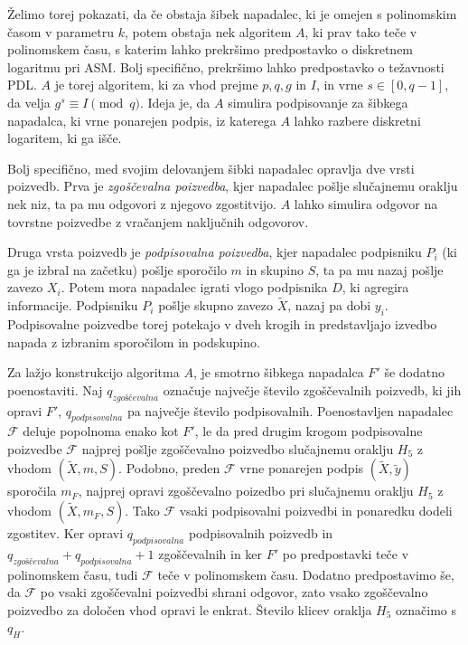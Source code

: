\documentclass[isrm2, tisk]{fmfdelo}
\begin{document}
Želimo torej pokazati, da če obstaja šibek napadalec, ki je omejen s polinomskim časom v parametru
$k$, potem obstaja nek algoritem $A$, ki prav tako teče v polinomskem času, s katerim lahko prekršimo
predpostavko o diskretnem logaritmu pri ASM. Bolj specifično, prekršimo lahko predpostavko o
težavnosti PDL. $A$ je torej algoritem, ki za vhod prejme $p, q, g$ in $I$, in vrne $s \in [0, q - 1]$,
da velja $g^s \equiv I \pmod q$. Ideja je, da $A$ simulira podpisovanje za šibkega napadalca,
ki vrne ponarejen podpis, iz katerega $A$ lahko razbere diskretni logaritem, ki ga išče.

Bolj specifično, med svojim delovanjem šibki napadalec opravlja dve vrsti poizvedb. Prva je
\textit{zgoščevalna poizvedba}, kjer napadalec pošlje slučajnemu oraklju nek niz, ta pa mu odgovori
z njegovo zgostitvijo. $A$ lahko simulira odgovor na tovrstne poizvedbe z vračanjem naključnih odgovorov.

Druga vrsta poizvedb je \textit{podpisovalna poizvedba}, kjer napadalec podpisniku $P_i$ (ki ga je 
izbral na začetku) pošlje sporočilo $m$ in skupino $S$, ta pa mu nazaj pošlje zavezo $X_i$. Potem
mora napadalec igrati vlogo podpisnika $D$, ki agregira informacije. Podpisniku $P_i$ pošlje skupno
zavezo $\tilde{X}$, nazaj pa dobi $y_i$. Podpisovalne poizvedbe torej potekajo v dveh krogih in
predstavljajo izvedbo napada z izbranim sporočilom in podskupino.

Za lažjo konstrukcijo algoritma $A$, je smotrno šibkega napadalca $F'$ še dodatno poenostaviti. Naj
$q_{zgoščevalna}$ označuje največje število zgoščevalnih poizvedb, ki jih opravi $F'$, $q_{podpisovalna}$
pa največje število podpisovalnih. Poenostavljen napadalec $\mathcal{F}$ deluje popolnoma enako kot $F'$,
le da pred drugim krogom podpisovalne poizvedbe $\mathcal{F}$ najprej pošlje zgoščevalno poizvedbo slučajnemu
oraklju $H_5$ z vhodom $(\tilde{X}, m, S)$. Podobno, preden $\mathcal{F}$ vrne ponarejen podpis $(\tilde{X}, 
\tilde{y})$ sporočila $m_F$, najprej opravi zgoščevalno poizedbo pri slučajnemu oraklju $H_5$ z
vhodom $(\tilde{X}, m_F, S)$. Tako $\mathcal{F}$ vsaki podpisovalni poizvedbi in ponaredku dodeli
zgostitev. Ker opravi $q_{podpisovalna}$ podpisovalnih poizvedb in $q_{zgoščevalna} + q_{podpisovalna} + 1$
zgoščevalnih in ker $F'$ po predpostavki teče v polinomskem času, tudi $\mathcal{F}$ teče v
polinomskem času. Dodatno predpostavimo še, da $\mathcal{F}$ po vsaki zgoščevalni poizvedbi shrani
odgovor, zato vsako zgoščevalno poizvedbo za določen vhod opravi le enkrat. Število klicev oraklja
$H_5$ označimo s $q_H$.
\end{document}
